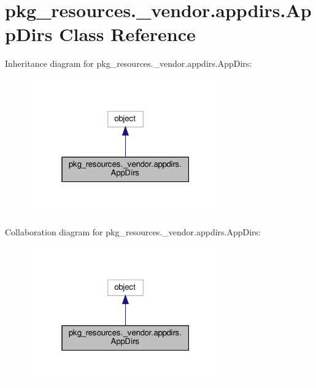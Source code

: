 \hypertarget{classpkg__resources_1_1__vendor_1_1appdirs_1_1AppDirs}{}\section{pkg\+\_\+resources.\+\_\+vendor.\+appdirs.\+App\+Dirs Class Reference}
\label{classpkg__resources_1_1__vendor_1_1appdirs_1_1AppDirs}


Inheritance diagram for pkg\+\_\+resources.\+\_\+vendor.\+appdirs.\+App\+Dirs\+:
\nopagebreak
\begin{figure}[H]
\begin{center}
\leavevmode
\includegraphics[width=235pt]{classpkg__resources_1_1__vendor_1_1appdirs_1_1AppDirs__inherit__graph}
\end{center}
\end{figure}


Collaboration diagram for pkg\+\_\+resources.\+\_\+vendor.\+appdirs.\+App\+Dirs\+:
\nopagebreak
\begin{figure}[H]
\begin{center}
\leavevmode
\includegraphics[width=235pt]{classpkg__resources_1_1__vendor_1_1appdirs_1_1AppDirs__coll__graph}
\end{center}
\end{figure}
